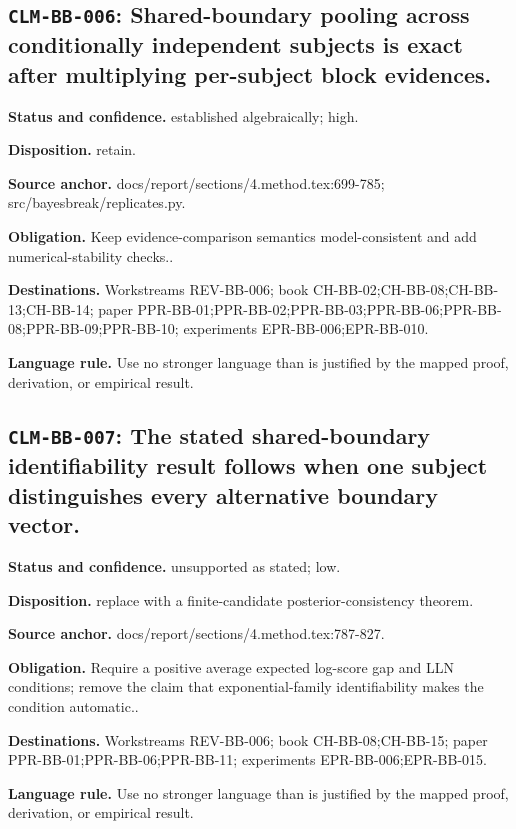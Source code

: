 \subsection[\texttt{CLM-BB-006}]{\texttt{CLM-BB-006}: Shared-boundary pooling across conditionally independent subjects is exact after multiplying per-subject block evidences.}
\textbf{Status and confidence.} established algebraically; high.\par
\textbf{Disposition.} retain.\par
\textbf{Source anchor.} docs/report/sections/4.method.tex:699-785; src/bayesbreak/replicates.py.\par
\textbf{Obligation.} Keep evidence-comparison semantics model-consistent and add numerical-stability checks..\par
\textbf{Destinations.} Workstreams REV-BB-006; book CH-BB-02;CH-BB-08;CH-BB-13;CH-BB-14; paper PPR-BB-01;PPR-BB-02;PPR-BB-03;PPR-BB-06;PPR-BB-08;PPR-BB-09;PPR-BB-10; experiments EPR-BB-006;EPR-BB-010.\par
\textbf{Language rule.} Use no stronger language than is justified by the mapped proof, derivation, or empirical result.

\subsection[\texttt{CLM-BB-007}]{\texttt{CLM-BB-007}: The stated shared-boundary identifiability result follows when one subject distinguishes every alternative boundary vector.}
\textbf{Status and confidence.} unsupported as stated; low.\par
\textbf{Disposition.} replace with a finite-candidate posterior-consistency theorem.\par
\textbf{Source anchor.} docs/report/sections/4.method.tex:787-827.\par
\textbf{Obligation.} Require a positive average expected log-score gap and LLN conditions; remove the claim that exponential-family identifiability makes the condition automatic..\par
\textbf{Destinations.} Workstreams REV-BB-006; book CH-BB-08;CH-BB-15; paper PPR-BB-01;PPR-BB-06;PPR-BB-11; experiments EPR-BB-006;EPR-BB-015.\par
\textbf{Language rule.} Use no stronger language than is justified by the mapped proof, derivation, or empirical result.

